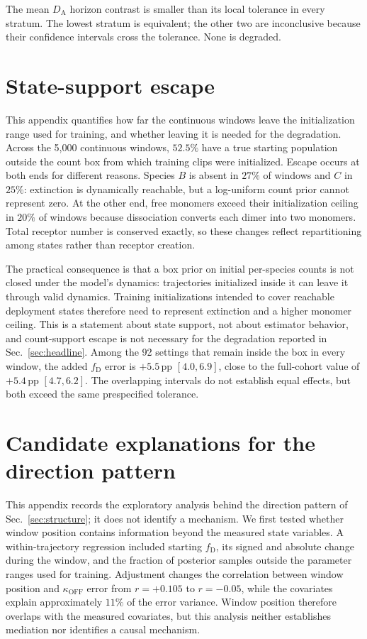 \documentclass{article}
\newcommand{\fD}{f_{\mathrm{D}}}
\newcommand{\DA}{D_{\mathrm{A}}}
\newcommand{\koff}{\kappa_{\mathrm{OFF}}}
\newcommand{\pp}{\,\mathrm{pp}}
\begin{document}
The mean $\DA$ horizon contrast is smaller than its local tolerance in every
stratum. The lowest stratum is equivalent; the other two are inconclusive
because their confidence intervals cross the tolerance. None is degraded.

\section{State-support escape}
\label{app:support}

This appendix quantifies how far the continuous windows leave the
initialization range used for training, and whether leaving it is needed for
the degradation. Across the 5,000 continuous windows, $52.5\%$ have a true starting population
outside the count box from which training clips were initialized. Escape occurs
at both ends for different reasons. Species $B$ is absent in $27\%$ of windows
and $C$ in $25\%$: extinction is dynamically reachable, but a log-uniform count
prior cannot represent zero. At the other end, free monomers exceed their
initialization ceiling in $20\%$ of windows because dissociation converts each
dimer into two monomers. Total receptor number is conserved exactly, so these
changes reflect repartitioning among states rather than receptor creation.

The practical consequence is that a box prior on initial per-species counts is
not closed under the model's dynamics: trajectories initialized inside it can
leave it through valid dynamics. Training initializations intended to cover
reachable deployment states therefore need to represent extinction and a
higher monomer ceiling. This is a statement about state support, not about
estimator behavior,
and count-support escape is not necessary for the degradation reported in
Sec.~\ref{sec:headline}. Among the 92 settings that remain inside the box in
every window, the added $\fD$ error is $+5.5\pp$ $[4.0,6.9]$, close to the
full-cohort value of $+5.4\pp$ $[4.7,6.2]$. The overlapping intervals do not
establish equal effects, but both exceed the same prespecified tolerance.

\section{Candidate explanations for the direction pattern}
\label{app:mechanism}

This appendix records the exploratory analysis behind the direction pattern
of Sec.~\ref{sec:structure}; it does not identify a mechanism. We first tested
whether window position contains information beyond the measured
state variables. A within-trajectory regression included starting $\fD$,
its signed and absolute change during the window, and the fraction of
posterior samples outside the parameter ranges used for training. Adjustment
changes the correlation between window position and $\koff$ error from
$r=+0.105$ to $r=-0.05$, while the covariates explain approximately $11\%$
of the error variance. Window position therefore overlaps with the measured
covariates, but this analysis neither establishes mediation nor identifies a
causal mechanism.
\end{document}
